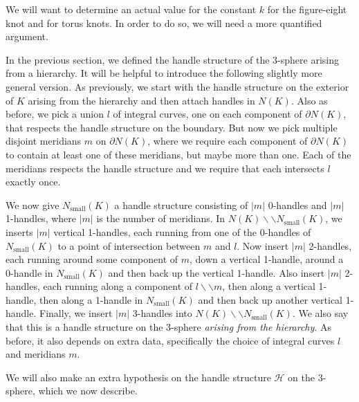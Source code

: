 \documentclass[oneside]{amsart}
\numberwithin{equation}{section}
\theoremstyle{plain}
\theoremstyle{definition}
\newcommand{\cut}{\backslash\backslash}
\newcommand{\calH}{\mathcal{H}}
\begin{document}
We will want to determine an actual value for the constant $k$ for the figure-eight knot and for torus knots.
In order to do so, we will need a more quantified argument. 

In the previous section, we defined the handle structure of the 3-sphere arising from a hierarchy.
It will be helpful to introduce the following slightly more general version. As previously,
we start with the handle structure on the exterior of $K$ arising from the hierarchy and then attach handles in $N(K)$. Also as before,
we pick a union $l$ of integral curves, one on each component of $\partial N(K)$, that respects the handle structure on the boundary.
But now we pick multiple disjoint meridians $m$ on $\partial N(K)$, where we 
require each component of $\partial N(K)$ to contain at least one of these meridians, but maybe more than one. Each
of the meridians respects the handle structure and we require that each intersects $l$ exactly once.

We now give $N_{\textrm{small}}(K)$ a handle structure consisting of $|m|$ 0-handles and $|m|$ 1-handles,
where $|m|$ is the number of meridians. In $N(K) \cut N_{\textrm{small}}(K)$, we inserts $|m|$ vertical
1-handles, each running from one of the 0-handles of $N_{\textrm{small}}(K)$ to a point of intersection
between $m$ and $l$. Now insert $|m|$ 2-handles, each running around some component of $m$,
down a vertical 1-handle, around a 0-handle in $N_{\textrm{small}}(K)$ and then back up the vertical 1-handle.
Also insert $|m|$ 2-handles, each running along a component of $l \cut m$,
then along a vertical 1-handle, then along a 1-handle in $N_{\textrm{small}}(K)$ and then back up another
vertical 1-handle. Finally, we insert $|m|$ 3-handles into $N(K) \cut N_{\textrm{small}}(K)$.
We also say that this is a handle structure on the 3-sphere \emph{arising from the hierarchy}.
As before, it also depends on extra data, specifically the choice of integral curves $l$ and
meridians $m$.

We will also make an extra
hypothesis on the handle structure $\calH$ on the 3-sphere, which we now describe.
\end{document}

